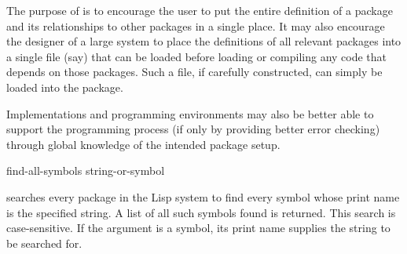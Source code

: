 \begin{defmac}
The purpose of  is to encourage the user to
put the entire definition of a package and its relationships to
other packages in a single place.  It may also encourage the designer
of a large system to place the definitions of all relevant packages
into a single file (say) that can be loaded before loading or compiling
any code that depends on those packages.  Such a file, if carefully
constructed, can simply be loaded into the  package.

Implementations and programming environments may also be better able
to support the programming process (if only by providing better
error checking) through global knowledge of the intended package setup.
\end{defmac}

\begin{defun}[Function]
find-all-symbols string-or-symbol

searches every package in the Lisp system to find
every symbol whose print name is the
specified string.  A list of all such symbols found is returned.
This search is case-sensitive.
If the argument is a symbol, its print name supplies
the string to be searched for.
\end{defun}

